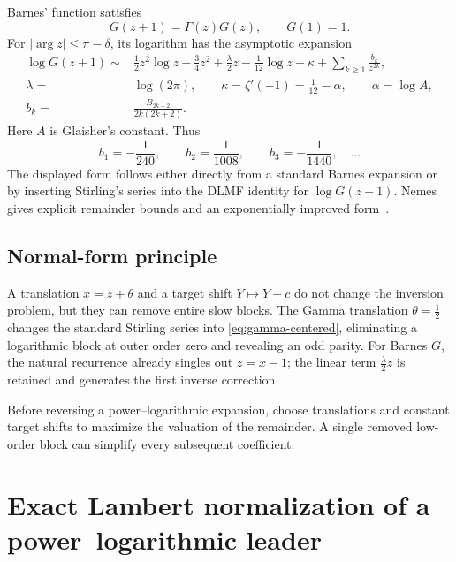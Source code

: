 \documentclass[11pt,a4paper]{article}
\numberwithin{equation}{section}
\theoremstyle{definition}
\theoremstyle{remark}
\begin{document}
Barnes' function satisfies
\begin{equation}
 G(z+1)=\Gamma(z)G(z),\qquad G(1)=1.
 \label{eq:barnes-recurrence}
\end{equation}
For \(|\arg z|\leq\pi-\delta\), its logarithm has the asymptotic
expansion~\cite{DLMFBarnes,Nemes}
\begin{align}
 \log G(z+1)\sim{}&
 \frac12z^2\log z-\frac34z^2
 +\frac{\lambda}{2}z-\frac1{12}\log z+\kappa
 +\sum_{k\ge1}\frac{b_k}{z^{2k}},
 \label{eq:barnes-forward}\\
 \lambda={}&\log(2\pi),\qquad
 \kappa=\zeta'(-1)=\frac1{12}-\alpha,
 \qquad \alpha=\log A,\label{eq:barnes-constants}\\
 b_k={}&\frac{B_{2k+2}}{2k(2k+2)}.
 \label{eq:bk-def}
\end{align}
Here \(A\) is Glaisher's constant.  Thus
\begin{equation}
 b_1=-\frac1{240},\qquad b_2=\frac1{1008},\qquad
 b_3=-\frac1{1440},\quad\ldots
 \label{eq:bk-first}
\end{equation}
The displayed form follows either directly from a standard Barnes
expansion or by inserting Stirling's series into the DLMF identity for
\(\log G(z+1)\).  Nemes gives explicit remainder bounds and an
exponentially improved form~\cite{Nemes}.

\subsection{Normal-form principle}

A translation \(x=z+\theta\) and a target shift \(Y\mapsto Y-c\) do not
change the inversion problem, but they can remove entire slow blocks.
The Gamma translation \(\theta=\tfrac12\) changes the standard Stirling
series into \cref{eq:gamma-centered}, eliminating a logarithmic block at
outer order zero and revealing an odd parity.  For Barnes \(G\), the
natural recurrence already singles out \(z=x-1\); the linear term
\(\tfrac\lambda2z\) is retained and generates the first inverse correction.

\begin{methodbox}[title={Practical normalization rule}]
Before reversing a power--logarithmic expansion, choose translations and
constant target shifts to maximize the valuation of the remainder.  A
single removed low-order block can simplify every subsequent coefficient.
\end{methodbox}

\section{Exact Lambert normalization of a power--logarithmic leader}
\end{document}
